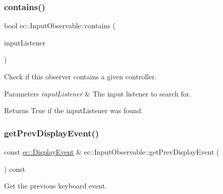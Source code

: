 \mbox{\label{classec_1_1_input_observable_a6e14f68359b8d7e1be60e8503a07ea87}} 
\subsubsection{\texorpdfstring{contains()}{contains()}}
{\footnotesize\ttfamily bool ec\+::\+Input\+Observable\+::contains (\begin{DoxyParamCaption}\item[{\mbox{\hyperlink{classec_1_1_input_listener}{Input\+Listener}} $\ast$}]{input\+Listener }\end{DoxyParamCaption})\hspace{0.3cm}{\ttfamily [virtual]}}



Check if this observer contains a given controller. 


\begin{DoxyParams}{Parameters}
{\em input\+Listener} & The input listener to search for. \\
\hline
\end{DoxyParams}
\begin{DoxyReturn}{Returns}
True if the input\+Listener was found. 
\end{DoxyReturn}
\mbox{\label{classec_1_1_input_observable_ac12e711d3a7dcaf65d2028d2283c1243}} 
\subsubsection{\texorpdfstring{get\+Prev\+Display\+Event()}{getPrevDisplayEvent()}}
{\footnotesize\ttfamily const \mbox{\hyperlink{structec_1_1_display_event}{ec\+::\+Display\+Event}} \& ec\+::\+Input\+Observable\+::get\+Prev\+Display\+Event (\begin{DoxyParamCaption}{ }\end{DoxyParamCaption}) const}



Get the previous keyboard event. 

